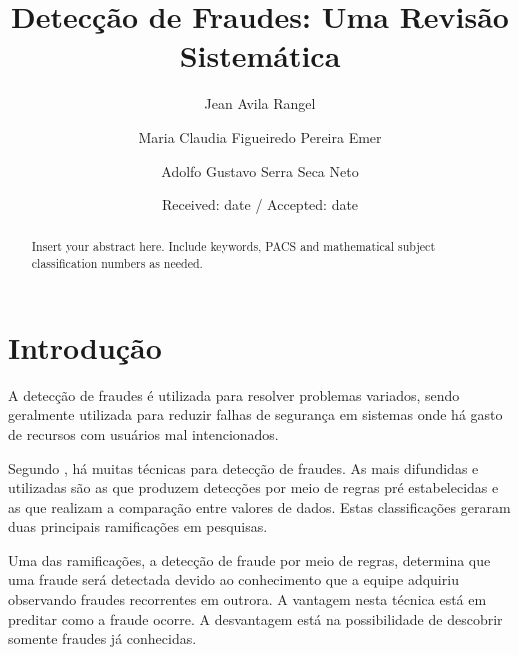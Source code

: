 \documentclass[smallextended]{svjour3}       %
\begin{document}
	
\title{Detecção de Fraudes: Uma Revisão Sistemática
}
\subtitle{}


\author{Jean Avila Rangel         \and
	Maria Claudia Figueiredo Pereira Emer \and
	Adolfo Gustavo Serra Seca Neto
}

	\date{Received: date / Accepted: date}
	\maketitle
	
	\begin{abstract}
		Insert your abstract here. Include keywords, PACS and mathematical
		subject classification numbers as needed.
	\end{abstract}
	
\section{Introdução}

A detecção de fraudes é utilizada para resolver problemas variados, sendo geralmente utilizada para reduzir falhas de segurança em sistemas onde há gasto de recursos com usuários mal intencionados.

Segundo \cite{Fawcett1997}, há muitas técnicas para detecção de fraudes. As mais difundidas e utilizadas são as que produzem detecções por meio de regras pré estabelecidas e as que realizam a comparação entre valores de dados. Estas classificações geraram duas principais ramificações em pesquisas.

Uma das ramificações, a detecção de fraude por meio de regras, determina que uma fraude será detectada devido ao conhecimento que a equipe adquiriu observando fraudes recorrentes em outrora. A vantagem nesta técnica está em preditar como a fraude ocorre. A desvantagem está na possibilidade de descobrir somente fraudes já conhecidas.
\end{document}
